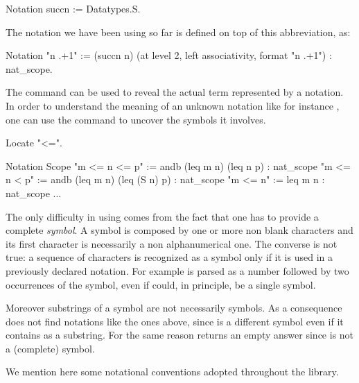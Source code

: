 \begin{coq}{}{}
Notation succn := Datatypes.S.
\end{coq}

The notation  we have been using so far is defined on top of
this abbreviation, as:

\begin{coq}{}{}
Notation "n .+1" := (succn n) (at level 2, left associativity,
  format "n .+1") : nat_scope.
\end{coq}

The  command can be used to reveal the actual term
represented by a notation.  In order to understand the meaning of an unknown notation like for instance , one can use the  command to uncover the symbols it involves.

\begin{coq}{}{}
Locate "<=".
\end{coq}
\begin{coqout}{}{}
Notation            Scope     
"m <= n <= p" := andb (leq m n) (leq n p) : nat_scope
"m <= n < p" := andb (leq m n) (leq (S n) p) : nat_scope
"m <= n" := leq m n  : nat_scope
...
\end{coqout}

The only difficulty in using  comes from the fact
that one has to provide a complete \emph{symbol}.  A symbol
is composed by one or more non blank characters and its first
character is necessarily a non alphanumerical one.
The converse is not true: a sequence of characters is recognized as
a symbol only if it is used in a previously declared notation.
For example  is parsed as a number followed by two
occurrences of the  symbol, even if  could, in
principle, be a single symbol.  

Moreover substrings of a symbol are not necessarily symbols.  As a consequence
 does not find notations like the ones above, since \C{<=} is a
different symbol even if it contains \C{=} as a substring.  For the same reason
 returns an empty answer since  is not a (complete)
symbol.

We mention here some notational conventions 
adopted throughout the \mcbMC{} library.


